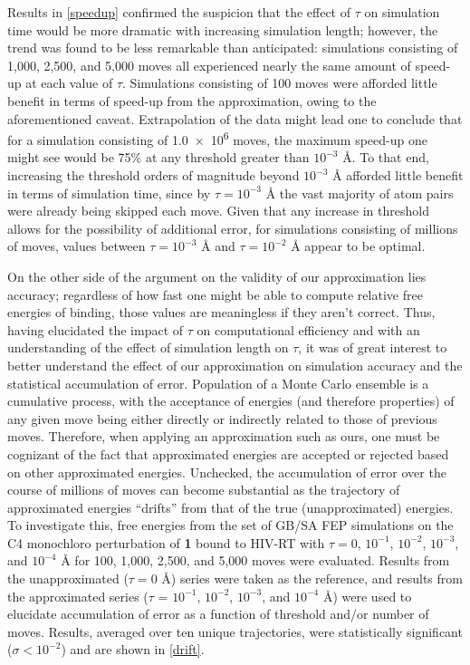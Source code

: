 \documentclass[12pt]{report}
\begin{document}
Results in \cref{speedup} confirmed the suspicion that the effect of $\tau$ on simulation time would be more dramatic with increasing simulation length; however, the trend was found to be less remarkable than anticipated: simulations consisting of 1,000, 2,500, and 5,000 moves all experienced nearly the same amount of speed-up at each value of $\tau$. Simulations consisting of 100 moves were afforded little benefit in terms of speed-up from the approximation, owing to the aforementioned caveat. Extrapolation of the data might lead one to conclude that for a simulation consisting of \num{1.0e6} moves, the maximum speed-up one might see would be 75\% at any threshold greater than $10^{-3}$ \AA. To that end, increasing the threshold orders of magnitude beyond $10^{-3}$ \AA{} afforded little benefit in terms of simulation time, since by $\tau = 10^{-3}$ \AA{} the vast majority of atom pairs were already being skipped each move. Given that any increase in threshold allows for the possibility of additional error, for simulations consisting of millions of moves, values between $\tau = 10^{-3}$ \AA{} and $\tau = 10^{-2}$ \AA{} appear to be optimal.

On the other side of the argument on the validity of our approximation lies accuracy; regardless of how fast one might be able to compute relative free energies of binding, those values are meaningless if they aren't correct. Thus, having elucidated the impact of $\tau$ on computational efficiency and with an understanding of the effect of simulation length on $\tau$, it was of great interest to better understand the effect of our approximation on simulation accuracy and the statistical accumulation of error. Population of a Monte Carlo ensemble is a cumulative process, with the acceptance of energies (and therefore properties) of any given move being either directly or indirectly related to those of previous moves. Therefore, when applying an approximation such as ours, one must be cognizant of the fact that approximated energies are accepted or rejected based on other approximated energies. Unchecked, the accumulation of error over the course of millions of moves can become substantial as the trajectory of approximated energies ``drifts'' from that of the true (unapproximated) energies. To investigate this, free energies from the set of GB/SA FEP simulations on the C4 monochloro perturbation of \textbf{1} bound to HIV-RT with $\tau = 0$, $10^{-1}$, $10^{-2}$, $10^{-3}$, and $10^{-4}$ \AA{} for 100, 1,000, 2,500, and 5,000 moves were evaluated. Results from the unapproximated ($\tau = 0$ \AA) series were taken as the reference, and results from the approximated series ($\tau$ = $10^{-1}$, $10^{-2}$, $10^{-3}$, and $10^{-4}$ \AA) were used to elucidate accumulation of error as a function of threshold and/or number of moves. Results, averaged over ten unique trajectories, were statistically significant ($\sigma < 10^{-2}$) and are shown in \cref{drift}.
\end{document}
